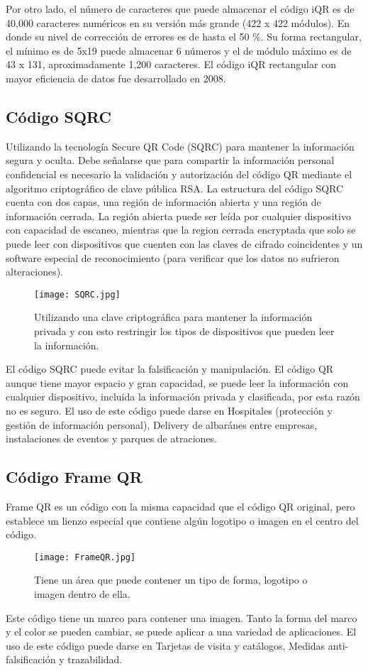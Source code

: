 Por otro lado, el número de caracteres que puede almacenar el código iQR es de 40,000 caracteres numéricos en su versión más grande (422 x 422 módulos). En donde su nivel de corrección de errores es de hasta el 50 \%. Su forma rectangular, el mínimo es de 5x19 puede almacenar 6 números y el de módulo máximo es de 43 x 131, aproximadamente 1,200 caracteres.\cite{qrcode2021}
El código iQR rectangular con mayor eficiencia de datos fue desarrollado en 2008.\cite{2019_Hara}

\subsection{Código SQRC}
Utilizando la tecnología Secure QR Code (SQRC) para mantener la información segura y oculta. Debe señalarse que para compartir la información personal confidencial es necesario la validación y autorización del código QR mediante el algoritmo criptográfico de clave pública RSA.\cite{Ahamed2019}
La estructura del código SQRC cuenta con dos capas, una región de información abierta y una región de información cerrada. La región abierta puede ser leída por cualquier dispositivo con capacidad de escaneo, mientras que la region cerrada encryptada que solo se puede leer con dispositivos que cuenten con las claves de cifrado coincidentes y un software especial de reconocimiento (para verificar que los datos no sufrieron alteraciones).\cite{2019_Hara}
\begin{figure} 
	\centering
	\texttt{[image: SQRC.jpg]}
	\caption{Utilizando una clave criptográfica para mantener la información privada y con esto restringir los tipos de dispositivos que pueden leer la información.}
\label{fig:sqrc}
\end{figure} 

El código SQRC puede evitar la falsificación y manipulación. El código QR aunque tiene mayor espacio y gran capacidad, se puede leer la información con cualquier dispositivo, incluida la información privada y clasificada, por esta razón no es seguro. El uso de este código puede darse en Hospitales (protección y gestión de información personal), Delivery de albaránes entre empresas, instalaciones de eventos y parques de atraciones.\cite{qrcode2021}

\subsection{Código Frame QR}
Frame QR es un código con la misma capacidad que el código QR original, pero establece un lienzo especial que contiene algún logotipo o imagen en el centro del código. \cite{2019_Hara}
\begin{figure} 
	\centering
	\texttt{[image: FrameQR.jpg]}
	\caption{Tiene un área que puede contener un tipo de forma, logotipo o imagen dentro de ella.}
	\label{fig:frameqr}
\end{figure}
Este código tiene un marco para contener una imagen. Tanto la forma del marco y el color se pueden cambiar, se puede aplicar a una variedad de aplicaciones. El uso de este código puede darse en Tarjetas de visita y catálogos, Medidas anti-falsificación y trazabilidad.\cite{qrcode2021}
